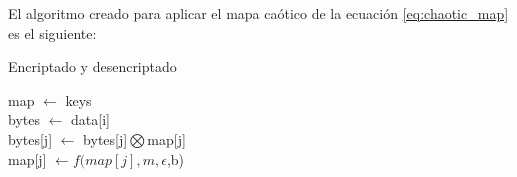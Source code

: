 El algoritmo creado para aplicar el mapa caótico de la ecuación \ref{eq:chaotic_map} es el siguiente:

\begin{algorithm}[H]
    \caption{Encriptado y desencriptado}
    map $\gets$ keys\\
    {
        bytes $\gets$ data[i]\\
        {
            bytes[j] $\gets$ bytes[j]$\bigotimes$map[j]\\
            map[j] $\gets f(map[j],m,\epsilon$,b)\\
        }
    }
\end{algorithm}